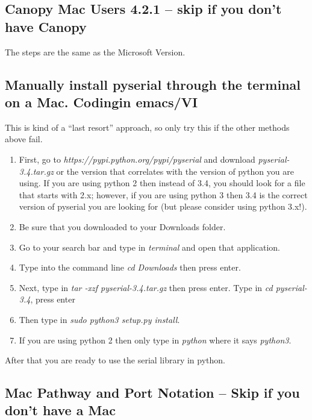 \subsection{Canopy Mac Users 4.2.1 -- skip if you don't have Canopy}

The steps are the same as the Microsoft Version.

\subsection{Manually install pyserial through the terminal on a Mac. Codingin emacs/VI}

This is kind of a ``last resort'' approach, so only try this if the other methods above fail.

\begin{enumerate}
	\item First, go to \textit{https://pypi.python.org/pypi/pyserial} and download \textit{pyserial-3.4.tar.gz} or the version that correlates with the version of python you are using. If you are using python 2 then instead of 3.4, you should look for a file that starts with 2.x; however, if you are using python 3 then 3.4 is the correct version of pyserial you are looking for (but please consider using python 3.x!).

	\item Be sure that you downloaded to your Downloads folder.

	\item Go to your search bar and type in \textit{terminal} and open that application.

	\item Type into the command line \textit{cd Downloads} then press enter.

	\item Next, type in \textit{tar -xzf pyserial-3.4.tar.gz} then press enter. Type in \textit{cd pyserial-3.4}, press enter

	\item Then type in \textit{sudo python3 setup.py install}. 

	\item If you are using python 2 then only type in \textit{python} where it says \textit{python3}.
\end{enumerate}

\noindent After that you are ready to use the serial library in python.

\subsection{Mac Pathway and Port Notation -- Skip if you don't have a Mac}

